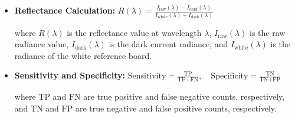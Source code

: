 \documentclass[10pt,svgnames,fragile]{beamer}
\begin{document}
\begin{frame}{}
\begin{itemize}
\begin{itemize}
    \item \textbf{Reflectance Calculation:}
    \(
    R(\lambda) = \frac{I_{\text{raw}}(\lambda) - I_{\text{dark}}(\lambda)}{I_{\text{white}}(\lambda) - I_{\text{dark}}(\lambda)}
    \)
    
    where \( R(\lambda) \) is the reflectance value at wavelength \( \lambda \), \( I_{\text{raw}}(\lambda) \) is the raw radiance value, \( I_{\text{dark}}(\lambda) \) is the dark current radiance, and \( I_{\text{white}}(\lambda) \) is the radiance of the white reference board.

    \item \textbf{Sensitivity and Specificity:}
    \(
    \text{Sensitivity} = \frac{\text{TP}}{\text{TP} + \text{FN}}, \quad \text{Specificity} = \frac{\text{TN}}{\text{TN} + \text{FP}}
    \)
    
    where \( \text{TP} \) and \( \text{FN} \) are true positive and false negative counts, respectively, and \( \text{TN} \) and \( \text{FP} \) are true negative and false positive counts, respectively.
    \end{itemize}

\end{itemize}
\end{frame}
\end{document}
